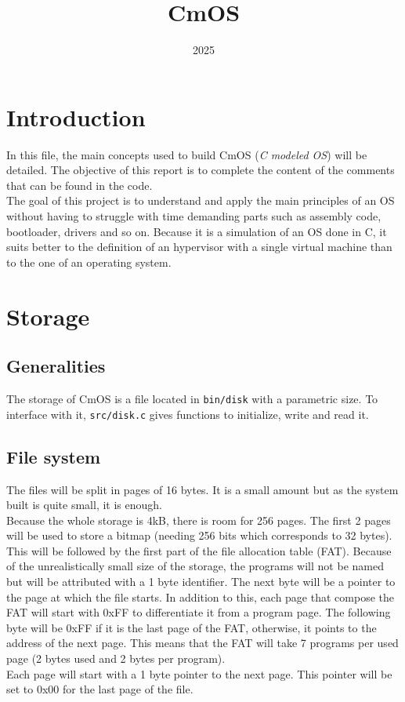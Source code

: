 \documentclass[a4paper,12pt]{article}
\title{CmOS}
\date{2025}
\begin{document}
\maketitle


\section{Introduction}

In this file, the main concepts used to build CmOS (\textit{C modeled OS}) will be detailed. The objective of this report is to complete the content of the comments that can be found in the code.\\
The goal of this project is to understand and apply the main principles of an OS without having to struggle with time demanding parts such as assembly code, bootloader, drivers and so on. Because it is a simulation of an OS done in C, it suits better to the definition of an hypervisor with a single virtual machine than to the one of an operating system.

\section{Storage}

\subsection{Generalities}

The storage of CmOS is a file located in \texttt{bin/disk} with a parametric size. To interface with it, \texttt{src/disk.c} gives functions to initialize, write and read it.

\subsection{File system}

The files will be split in pages of 16 bytes. It is a small amount but as the system built is quite small, it is enough. \\
Because the whole storage is 4kB, there is room for 256 pages. The first 2 pages will be used to store a bitmap (needing 256 bits which corresponds to 32 bytes).\\
This will be followed by the first part of the file allocation table (FAT). Because of the unrealistically small size of the storage, the programs will not be named but will be attributed with a 1 byte identifier. The next byte will be a pointer to the page at which the file starts. In addition to this, each page that compose the FAT will start with 0xFF to differentiate it from a program page. The following byte will be 0xFF if it is the last page of the FAT, otherwise, it points to the address of the next page. This means that the FAT will take 7 programs per used page (2 bytes used and 2 bytes per program).\\
Each page will start with a 1 byte pointer to the next page. This pointer will be set to 0x00 for the last page of the file.
\end{document}
